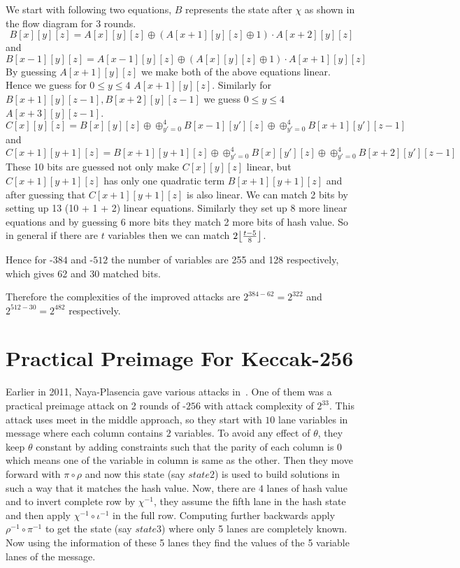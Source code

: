 		We start with following two equations, $B$ represents the state after $\chi$ as shown in the flow diagram for 3 rounds.
		\[
			B[x][y][z] = A[x][y][z] \oplus (A[x+1][y][z] \oplus 1) \cdot A[x+2][y][z]
		\] and
		\[
			B[x-1][y][z] = A[x-1][y][z] \oplus (A[x][y][z] \oplus 1) \cdot A[x+1][y][z]
		\]
		By guessing $A[x+1][y][z]$ we make both of the above equations linear. Hence we guess for $0 \leq y \leq 4$ $A[x+1][y][z]$. Similarly for $B[x+1][y][z-1], B[x+2][y][z-1]$ we guess $0 \leq y \leq 4$ $A[x+3][y][z-1]$.
		\[
        C[x][y][z] = B[x][y][z] \oplus \oplus_{y' = 0}^{4} B[x-1][y'][z] \oplus \oplus_{y' = 0}^{4} B[x+1][y'][z-1]
    \] and 
		\[
        C[x+1][y+1][z] = B[x+1][y+1][z] \oplus \oplus_{y' = 0}^{4} B[x][y'][z] \oplus \oplus_{y' = 0}^{4} B[x+2][y'][z-1]
    \]
		These 10 bits are guessed not only make $C[x][y][z]$ linear, but $C[x+1][y+1][z]$ has only one quadratic term $B[x+1][y+1][z]$ and after guessing that $C[x+1][y+1][z]$ is also linear. We can match 2 bits by setting up 13 (10 + 1 + 2) linear equations. Similarly they set up 8 more linear equations and by guessing 6 more bits they match 2 more bits of hash value. So in general if there are $t$ variables then we can match $ 2\floor*{\frac{t-5}{8}}$.

		Hence for \KECCAK-$384$ and \KECCAK-$512$ the number of variables are 255 and 128 respectively, which gives 62 and 30 matched bits.
		
		Therefore the complexities of the improved attacks are $2^{384 - 62} = 2^{322}$ and $2^{512 - 30} = 2^{482}$ respectively.

\section{Practical Preimage For Keccak-256}

Earlier in 2011, Naya-Plasencia \etal gave various attacks in~\cite{naya2011practical}. One of them was a practical preimage attack on 2 rounds of \KECCAK-$256$ with attack complexity of $2^{33}$. This attack uses meet in the middle approach, so they start with $10$ lane variables in message where each column contains $2$ variables. To avoid any effect of $\theta$, they keep $\theta$ constant by adding constraints such that the parity of each column is $0$ which means one of the variable in column is same as the other. Then they move forward with $\pi \circ \rho$ and now this state (say $state2$) is used to build solutions in such a way that it matches the hash value. Now, there are $4$ lanes of hash value and to invert complete row by $\chi^{-1}$, they assume the fifth lane in the hash state and then apply $\chi^{-1} \circ \iota^{-1}$ in the full row. Computing further backwards apply $\rho^{-1} \circ \pi^{-1}$ to get the state (say $state3$) where only 5 lanes are completely known. Now using the information of these 5 lanes they find the values of the 5 variable lanes of the message.

